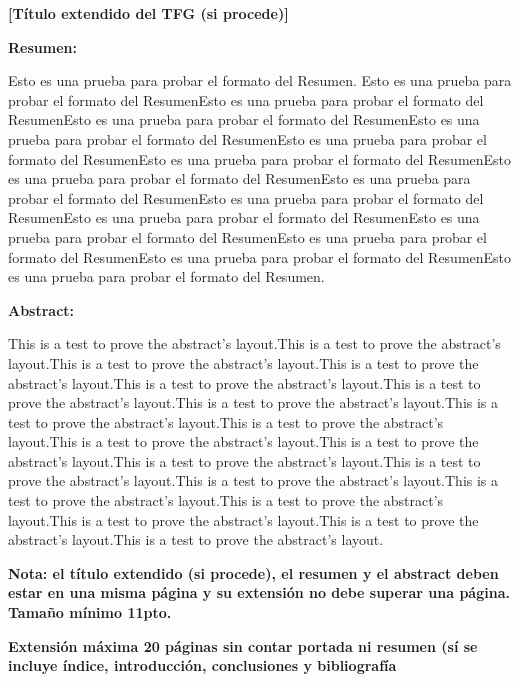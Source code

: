 \documentclass[11pt, a4paper]{article} %
\begin{document}
{\bfseries \large [Título extendido del TFG (si procede)] }\vspace{10mm} 

{\bfseries \large Resumen:} \vspace{5mm}

Esto es una prueba para probar el formato del Resumen. Esto es una prueba para probar el formato del ResumenEsto es una prueba para probar el formato del ResumenEsto es una prueba para probar el formato del ResumenEsto es una prueba para probar el formato del ResumenEsto es una prueba para probar el formato del ResumenEsto es una prueba para probar el formato del ResumenEsto es una prueba para probar el formato del ResumenEsto es una prueba para probar el formato del ResumenEsto es una prueba para probar el formato del ResumenEsto es una prueba para probar el formato del ResumenEsto es una prueba para probar el formato del ResumenEsto es una prueba para probar el formato del ResumenEsto es una prueba para probar el formato del ResumenEsto es una prueba para probar el formato del Resumen.
\vspace{1cm}

{\bfseries \large Abstract: }\vspace{5mm} 

This is a test to prove the abstract's layout.This is a test to prove the abstract's layout.This is a test to prove the abstract's layout.This is a test to prove the abstract's layout.This is a test to prove the abstract's layout.This is a test to prove the abstract's layout.This is a test to prove the abstract's layout.This is a test to prove the abstract's layout.This is a test to prove the abstract's layout.This is a test to prove the abstract's layout.This is a test to prove the abstract's layout.This is a test to prove the abstract's layout.This is a test to prove the abstract's layout.This is a test to prove the abstract's layout.This is a test to prove the abstract's layout.This is a test to prove the abstract's layout.This is a test to prove the abstract's layout.This is a test to prove the abstract's layout.This is a test to prove the abstract's layout.
\vspace{1cm}

{\Large\textbf{Nota: el título extendido (si procede), el resumen y el abstract deben estar en una misma página y su extensión no debe superar una página. Tamaño mínimo 11pto.}}
\vspace{1cm}

{\Large\textbf{Extensión máxima 20 páginas sin contar portada ni resumen (sí se incluye índice, introducción, conclusiones y bibliografía}}
\newpage
\tableofcontents
\newpage







\newpage

\newpage

\printbibliography[heading=bibintoc]
\end{document}
